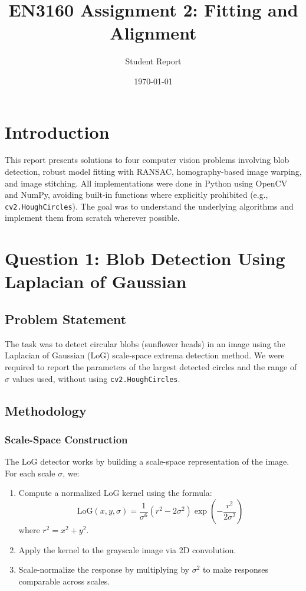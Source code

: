 \documentclass[11pt,a4paper]{article}
\title{EN3160 Assignment 2: Fitting and Alignment}
\author{Student Report}
\date{\today}
\begin{document}
\maketitle

\section{Introduction}
This report presents solutions to four computer vision problems involving blob detection, robust model fitting with RANSAC, homography-based image warping, and image stitching. All implementations were done in Python using OpenCV and NumPy, avoiding built-in functions where explicitly prohibited (e.g., \texttt{cv2.HoughCircles}). The goal was to understand the underlying algorithms and implement them from scratch wherever possible.

\section{Question 1: Blob Detection Using Laplacian of Gaussian}

\subsection{Problem Statement}
The task was to detect circular blobs (sunflower heads) in an image using the Laplacian of Gaussian (LoG) scale-space extrema detection method. We were required to report the parameters of the largest detected circles and the range of $\sigma$ values used, without using \texttt{cv2.HoughCircles}.

\subsection{Methodology}

\subsubsection{Scale-Space Construction}
The LoG detector works by building a scale-space representation of the image. For each scale $\sigma$, we:
\begin{enumerate}
    \item Compute a normalized LoG kernel using the formula:
    \[
    \text{LoG}(x, y, \sigma) = \frac{1}{\sigma^6} \left( r^2 - 2\sigma^2 \right) \exp\left(-\frac{r^2}{2\sigma^2}\right)
    \]
    where $r^2 = x^2 + y^2$.
    
    \item Apply the kernel to the grayscale image via 2D convolution.
    
    \item Scale-normalize the response by multiplying by $\sigma^2$ to make responses comparable across scales.
\end{enumerate}
\end{document}
